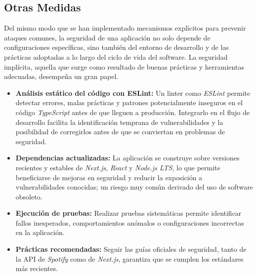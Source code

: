 \subsection{Otras Medidas}

Del mismo modo que se han implementado mecanismos explícitos para prevenir ataques comunes, la seguridad de una aplicación no solo depende de configuraciones específicas, sino también del entorno de desarrollo y de las prácticas adoptadas a lo largo del ciclo de vida del software. La seguridad implícita, aquella que surge como resultado de buenas prácticas y herramientas adecuadas, desempeña un gran papel.

\begin{itemize}
    \item \textbf{Análisis estático del código con ESLint:} Un linter como \textit{ESLint} permite detectar errores, malas prácticas y patrones potencialmente inseguros en el código \textit{TypeScript} antes de que lleguen a producción. Integrarlo en el flujo de desarrollo facilita la identificación temprana de vulnerabilidades y la posibilidad de corregirlos antes de que se conviertan en problemas de seguridad.

    \item \textbf{Dependencias actualizadas:} La aplicación se construye sobre versiones recientes y estables de \textit{Next.js}, \textit{React} y \textit{Node.js LTS}, lo que permite beneficiarse de mejoras en seguridad y reducir la exposición a vulnerabilidades conocidas; un riesgo muy común derivado del uso de software obsoleto.

    \item \textbf{Ejecución de pruebas:} Realizar pruebas sistemáticas permite identificar fallos inesperados, comportamientos anómalos o configuraciones incorrectas en la aplicación.

    \item \textbf{Prácticas recomendadas:} Seguir las guías oficiales de seguridad, tanto de la API de \textit{Spotify} como de \textit{Next.js}, garantiza que se cumplen los estándares más recientes.
\end{itemize}
